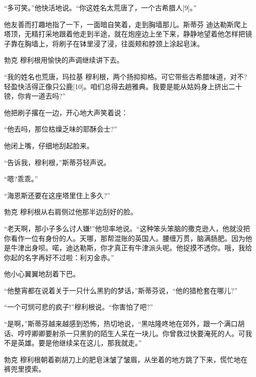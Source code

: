 \documentclass{article}
\begin{document}
“多可笑。”他快活地说。“你这姓名太荒唐了，一个古希腊人[9]。”



他友善而打趣地指了一下，一面暗自笑着，走到胸墙那儿。斯蒂芬 \cdot 迪达勒斯爬上塔顶，无精打采地跟着他走到半途，就在炮座边上坐下来，静静地望着他怎样把镜子靠在胸墙上，将刷子在钵里浸了浸，往面颊和脖颈上涂起皂沫。



勃克 \cdot 穆利根用愉快的声调继续讲下去。



“我的姓名也荒唐，玛拉基 \cdot 穆利根，两个扬抑抑格。可它带些古希腊味道，对不?轻盈快活得正像只公鹿[10]。咱们总得去趟雅典。我要是能从姑妈身上挤出二十镑，你肯一道去吗?”



他把刷子撂在一边，开心地大声笑着说：



“他去吗，那位枯燥乏味的耶酥会士?”



他闭上嘴，仔细地刮起脸来。



“告诉我，穆利根，”斯蒂芬轻声说。



“嗯?乖乖。”



“海恩斯还要在这座塔里住上多久?”



勃克 \cdot 穆利根从右肩侧过他那半边刮好的脸。



“老天啊，那小子多么讨人嫌!”他坦率地说。“这种笨头笨脑的撒克逊人，他就没把你看作一位有身份的人。天哪，那帮混账的英国人。腰缠万贯，脑满肠肥。因为他是牛津出身呗。喏，迪达勒斯，你才真正有牛津派头呢。他捉摸不透你。哦，我给你起的名字再好不过啦：利刃金赤。”



他小心翼翼地刮着下巴。



“他整宵都在说着关于一只什么黑豹的梦话，”斯蒂芬说，“他的猎枪套在哪儿?”



“一个可悯可悲的疯子!”穆利根说。“你害怕了吧?”



“是啊，”斯蒂芬越来越感到恐怖，热切地说，“黑咕隆咚地在郊外，跟一个满口胡话、哼哼卿卿要射杀一只黑豹的陌生人呆在一块儿。你曾救过快要淹死的人。可我不是英雄。要是他继续呆在这儿，那我就走。”



勃克 \cdot 穆利根朝着剃胡刀上的肥皂沫皱了皱眉，从坐着的地方跳了下来，慌忙地在裤兜里摸索。
\end{document}
